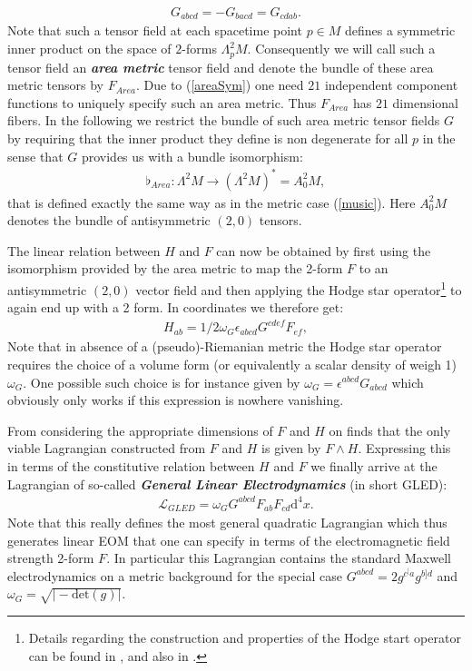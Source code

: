 \begin{align}\label{areaSym}
    G_{abcd} = -G_{bacd} = G_{cdab}.
\end{align}
Note that such a tensor field at each spacetime point $p\in M$ defines a symmetric inner product on the space of $2$-forms $\Lambda^2_pM$. Consequently we will call such a tensor field an \textbf{\textit{area metric}} tensor field and denote the bundle of these area metric tensors by $F_{Area}$. Due to (\ref{areaSym}) one need $21$ independent component functions to uniquely specify such an area metric. Thus $F_{Area}$ has $21$ dimensional fibers.   In the following we restrict the bundle of such area metric tensor fields $G$ by requiring that the inner product they define is non degenerate for all $p$ in the sense that $G$ provides us with a bundle isomorphism: 
\begin{align}
\flat_{Area} : \Lambda^2M \longrightarrow (\Lambda^2M)^{\ast} = A^2_0M,
\end{align}
that is defined exactly the same way as in the metric case (\ref{music}). Here $A^2_0M$ denotes the bundle of antisymmetric $(2,0)$ tensors. 

The linear relation between $H$ and $F$ can now be obtained by first using the isomorphism provided by the area metric to map the 2-form $F$ to an antisymmetric $(2,0)$ vector field and then applying the Hodge star operator\footnote{Details regarding the construction and properties of the Hodge start operator can be found in \cite{Abraham:1988:MTA:50877}, and also in \cite{nlab:Hodge}.} to again end up with a 2 form. In coordinates we therefore get:
\begin{align}
    H_{ab} = 1/2 \omega_G \epsilon_{abcd} G^{cdef} F_{ef},
\end{align}
Note that in absence of a (pseudo)-Riemanian metric the Hodge star operator requires the choice of a volume form (or equivalently a scalar density of weigh 1) $\omega_G$. One possible such choice is for instance given by $\omega_G = \epsilon^{abcd}G_{abcd}$ which obviously only works if this expression is nowhere vanishing.

From considering the appropriate dimensions of $F$ and $H$ on finds that the only viable Lagrangian constructed from $F$ and $H$ is given by $F \wedge H$. Expressing this in terms of the constitutive relation between $H$ and $F$ we finally arrive at the Lagrangian of so-called \textbf{\textit{General Linear Electrodynamics}} (in short GLED):
\begin{align}
    \mathcal{L}_{GLED} = \omega_G G^{abcd}F_{ab}F_{cd}\mathrm{d}^4x.
\end{align}
Note that this really defines the most general quadratic Lagrangian which thus generates linear EOM that one can specify in terms of the electromagnetic field strength 2-form $F$. In particular this Lagrangian contains the standard Maxwell electrodynamics on a metric background for the special case $G^{abcd} = 2 g^{c^[a}g^{b]d}$ and $\omega_{G}=\sqrt{\vert -\mathrm{det}(g) \vert}$.

